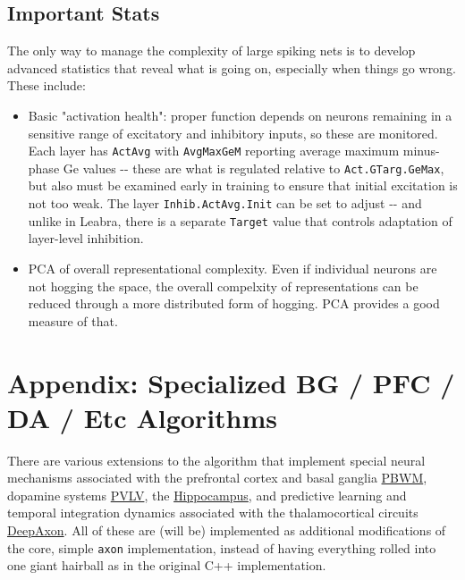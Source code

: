 \documentclass[11pt,twoside]{article}
\newif\myifpdf
\begin{document}
\hypertarget{important-stats}{%
\subsection{Important Stats}\label{important-stats}}

The only way to manage the complexity of large spiking nets is to
develop advanced statistics that reveal what is going on, especially
when things go wrong. These include:

\begin{itemize}
\item
  Basic "activation health": proper function depends on neurons
  remaining in a sensitive range of excitatory and inhibitory inputs, so
  these are monitored. Each layer has \texttt{ActAvg} with
  \texttt{AvgMaxGeM} reporting average maximum minus-phase Ge values
  -\/- these are what is regulated relative to \texttt{Act.GTarg.GeMax},
  but also must be examined early in training to ensure that initial
  excitation is not too weak. The layer \texttt{Inhib.ActAvg.Init} can
  be set to adjust -\/- and unlike in Leabra, there is a separate
  \texttt{Target} value that controls adaptation of layer-level
  inhibition.
\item
  PCA of overall representational complexity. Even if individual neurons
  are not hogging the space, the overall compelxity of representations
  can be reduced through a more distributed form of hogging. PCA
  provides a good measure of that.
\end{itemize}

\hypertarget{appendix-specialized-bg--pfc--da--etc-algorithms}{%
\section{Appendix: Specialized BG / PFC / DA / Etc
Algorithms}\label{appendix-specialized-bg--pfc--da--etc-algorithms}}

There are various extensions to the algorithm that implement special
neural mechanisms associated with the prefrontal cortex and basal
ganglia \protect\hyperlink{pbwm}{PBWM}, dopamine systems
\protect\hyperlink{pvlv}{PVLV}, the
\protect\hyperlink{hippocampus}{Hippocampus}, and predictive learning
and temporal integration dynamics associated with the thalamocortical
circuits \protect\hyperlink{deepaxon}{DeepAxon}. All of these are (will
be) implemented as additional modifications of the core, simple
\texttt{axon} implementation, instead of having everything rolled into
one giant hairball as in the original C++ implementation.
\end{document}
